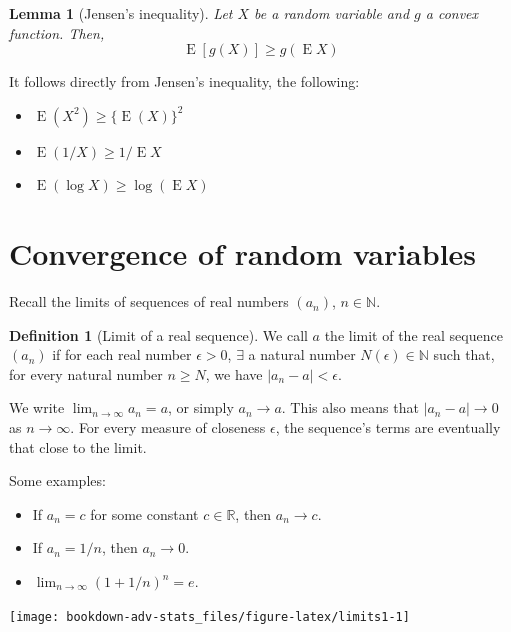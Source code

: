 \documentclass[
]{book}
\providecommand{\tightlist}{%
  \setlength{\itemsep}{0pt}\setlength{\parskip}{0pt}}
\DeclareMathOperator{\E}{E}
\newcommand{\bbR}{\mathbb{R}}
\newcommand{\bbN}{\mathbb{N}}
\newtheorem{lemma}{Lemma}[chapter]
\theoremstyle{definition}
\newtheorem{definition}{Definition}[chapter]
\theoremstyle{definition}
\theoremstyle{definition}
\theoremstyle{definition}
\theoremstyle{remark}
\begin{document}
\begin{lemma}[Jensen's inequality]
Let \(X\) be a random variable and \(g\) a convex function. Then, \[\E\left[g(X) \right] \geq g\left(\E X \right)\]
\end{lemma}

It follows directly from Jensen's inequality, the following:

\begin{itemize}
\tightlist
\item
  \(\E(X^2) \geq \{\E(X)\}^2\)
\item
  \(\E(1/X) \geq 1 / \E X\)
\item
  \(\E(\log X) \geq \log (\E X)\)
\end{itemize}

\hypertarget{convergence-of-random-variables}{%
\section{Convergence of random variables}\label{convergence-of-random-variables}}

Recall the limits of sequences of real numbers \((a_n)\), \(n\in\bbN\).

\begin{definition}[Limit of a real sequence]
We call \(a\) the limit of the real sequence \((a_n)\) if for each real
number \(\epsilon>0\), \(\exists\) a natural number \(N(\epsilon)\in\bbN\) such that, for
every natural number \(n\geq N\), we have \(|a_n-a| < \epsilon\).
\end{definition}

We write \(\lim_{n\to\infty} a_n = a\), or simply \(a_n \to a\). This also
means that \(|a_n-a| \to 0\) as \(n\to\infty\). For every measure of
closeness \(\epsilon\), the sequence's terms are eventually that close to
the limit.

Some examples:

\begin{itemize}
\tightlist
\item
  If \(a_n=c\) for some constant \(c\in\bbR\), then \(a_n\to c\).
\item
  If \(a_n=1/n\), then \(a_n\to 0\).
\item
  \(\lim_{n\to\infty}(1+1/n)^n = e\).
\end{itemize}

\begin{center}\texttt{[image: bookdown-adv-stats\_files/figure-latex/limits1-1]} \end{center}
\end{document}
